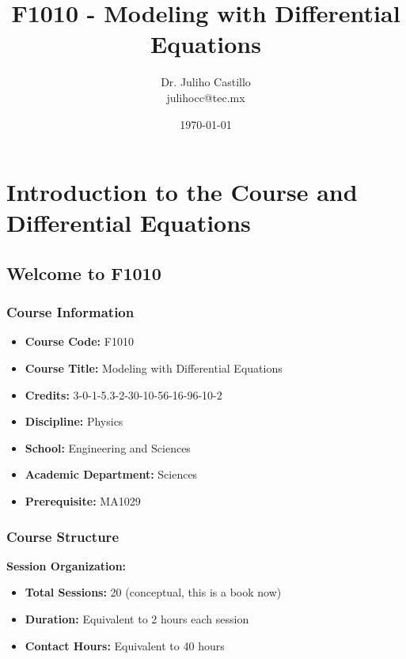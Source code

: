 \documentclass[12pt, letterpaper]{book}
\title{F1010 - Modeling with Differential Equations}
\author{Dr. Juliho Castillo\\julihocc@tec.mx}
\date{\today} %
\begin{document}
\frontmatter %
\maketitle

\tableofcontents

\mainmatter %

\chapter{Introduction to the Course and Differential Equations}
\label{chap:introduction}

\section{Welcome to F1010}
\label{sec:welcome}

\subsection{Course Information}
\label{ssec:course_info}
\begin{itemize}
    \item \textbf{Course Code:} F1010
    \item \textbf{Course Title:} Modeling with Differential Equations
    \item \textbf{Credits:} 3-0-1-5.3-2-30-10-56-16-96-10-2
    \item \textbf{Discipline:} Physics
    \item \textbf{School:} Engineering and Sciences
    \item \textbf{Academic Department:} Sciences
    \item \textbf{Prerequisite:} MA1029
\end{itemize}

\subsection{Course Structure}
\label{ssec:course_structure}
\textbf{Session Organization:}
\begin{itemize}
    \item \textbf{Total Sessions:} 20 (conceptual, this is a book now)
    \item \textbf{Duration:} Equivalent to 2 hours each session
    \item \textbf{Contact Hours:} Equivalent to 40 hours
\end{itemize}
\end{document}

